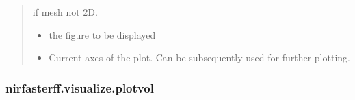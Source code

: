\documentclass[letterpaper,10pt,english]{sphinxmanual}
\begin{document}
\begin{fulllineitems}
\begin{quote}
\begin{description}
\begin{itemize}
\end{itemize}

\sphinxAtStartPar
{} \textendash{} if mesh not 2D.

\sphinxAtStartPar
\begin{itemize}
\item {} 
\sphinxAtStartPar
{} \textendash{} the figure to be displayed

\item {} 
\sphinxAtStartPar
{} \textendash{} Current axes of the plot. Can be subsequently used for further plotting.

\end{itemize}


\end{description}\end{quote}

\end{fulllineitems}


\sphinxstepscope


\subsubsection{nirfasterff.visualize.plotvol}
\label{\detokenize{_autosummary/nirfasterff.visualize.plotvol:nirfasterff-visualize-plotvol}}\label{\detokenize{_autosummary/nirfasterff.visualize.plotvol::doc}}
\end{document}
